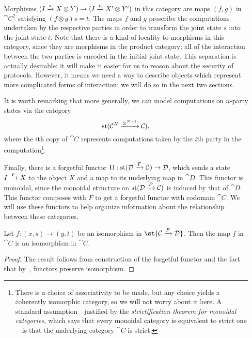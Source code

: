 Morphisms $(I\xrightarrow{s} X\otimes Y)\to(I\xrightarrow{t}X'\otimes Y')$ in this category are
maps $(f,g)$ in $\cat{C}^2$ satisfying $(f\otimes g)s = t$. The maps $f$ and $g$
prescribe the computations undertaken by the respective parties in order to
transform the joint state $s$ into the joint state $t$. Note that there is a
kind of locality to morphisms in this category, since they are morphisms in the
product category; all of the interaction between the two parties is encoded in
the initial joint state. This separation is actually desirable: it will make it
easier for us to reason about the security of protocols. However, it means we
need a way to describe objects which represent more complicated forms of
interaction; we will do so in the next two sections.

It is worth remarking that more generally, we can model computations on
$n$-party states via the category
\[
  \operatorname*{st}({\mathcal{C}}^N\xrightarrow{\otimes^{N-1}}{\mathcal{C}}),
\] where the $i$th copy of $\cat{C}$ represents computations taken by the $i$th
party in the computation\footnote{There is a choice of associativity to be made, but any
choice yields a coherently isomorphic category, so we will not worry about it
here. A standard assumption---justified by the \emph{strictification theorem for
monoidal categories}, which says that every monoidal category is equivalent to
strict one---is that the underlying category $\cat{C}$ is strict.}.

Finally, there is a forgetful functor $\Pi: \operatorname*{st}({\mathcal{D}}\xrightarrow{F}{\mathcal{C}})\to
{\mathcal{D}}$, which sends a state $I\xrightarrow{F}X$ to the object $X$ and a map to its
underlying map in $\cat{D}$. This functor is monoidal, since the monoidal
structure on $\operatorname*{st}({\mathcal{D}}\xrightarrow{F}{\mathcal{C}})$ is induced by that of $\cat{D}$.
This functor composes with $F$ to get a forgetful functor with codomain
$\cat{C}$. We will use these functors to help organize information about the
relationship between these categories.

\begin{prop}\label{thm:cat-elements-reflects-isos}
  Let $f: (x, s)\to (y, t)$ be an isomorphism in $\st{\cat{C}\xto{F}\cat{D}}$. Then
  the map $f$ in $\cat{C}$ is an isomorphism in $\cat{C}$.
\end{prop}

\begin{proof}
  The result follows from construction of the forgetful functor
  and the fact that by~,
  functors preserve isomorphism.
\end{proof}


